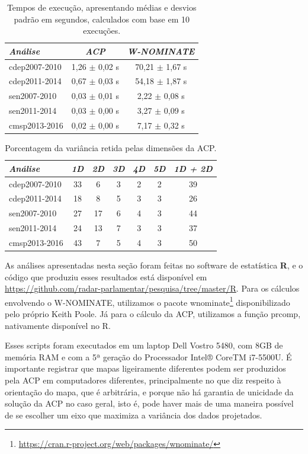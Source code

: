 \documentclass[
	article,			%
	12pt,				%
	oneside,			%
	a4paper,			%
	english,			%
	brazil,				%
	sumario=tradicional,
	oldfontcommands %
	]{abntex2}
\newcommand\wnominate{W-NOMINATE\xspace}
\begin{document}
\begin{table}
\centering
\begin{tabular}{l c c}
\itshape Análise & \itshape ACP & \itshape \wnominate \\
\hline
cdep2007-2010 & 1,26 $\pm$ 0,02 s & 70,21 $\pm$ 1,67 s \\ 
cdep2011-2014 & 0,67 $\pm$ 0,03 s & 54,18 $\pm$ 1,87 s \\ 
sen2007-2010  & 0,03 $\pm$ 0,01 s & 2,22 $\pm$ 0,08 s  \\ 
sen2011-2014  & 0,03 $\pm$ 0,00 s & 3,27 $\pm$ 0,09 s  \\ 
cmsp2013-2016 & 0,02 $\pm$ 0,00 s & 7,17 $\pm$ 0,32 s  \\ 
\end{tabular} 
\caption{Tempos de execução, apresentando médias e desvios padrão em segundos, calculados com base em 10 execuções.}
\label{tab:tempos}
\end{table}


\begin{table}
\centering
\begin{tabular}{l c c c c c | c}
\itshape Análise & \itshape 1D & \itshape 2D & \itshape 3D & \itshape 4D & \itshape 5D & \itshape 1D + 2D \\
\hline
cdep2007-2010 & 33 &  6 & 3 & 2 & 2 & 39  \\ 
cdep2011-2014 & 18 &  8 & 5 & 3 & 3 & 26  \\ 
sen2007-2010  & 27 & 17 & 6 & 4 & 3 & 44  \\ 
sen2011-2014  & 24 & 13 & 7 & 3 & 3 & 37  \\ 
cmsp2013-2016 & 43 &  7 & 5 & 4 & 3 & 50  \\ 
\end{tabular} 
\caption{Porcentagem da variância retida pelas dimensões da ACP.}
\label{tab:variacao-explicada-acp}
\end{table}

As análises apresentadas nesta seção foram feitas no software de estatística \textbf{R}, e o código que produziu esses resultados está disponível em \url{https://github.com/radar-parlamentar/pesquisa/tree/master/R}. Para os cálculos envolvendo o \wnominate, utilizamos o pacote \textsf{wnominate}\footnote{\url{https://cran.r-project.org/web/packages/wnominate/}} disponibilizado pelo próprio Keith Poole. Já para o cálculo da ACP, utilizamos a função \textsf{prcomp}, nativamente disponível no R.

Esses scripts foram executados em um laptop Dell Vostro 5480, com 8GB de memória RAM e com a 5ª geração do Processador Intel® CoreTM i7-5500U. É importante registrar que mapas ligeiramente diferentes podem ser produzidos pela ACP em computadores diferentes, principalmente no que diz respeito à orientação do mapa, que é arbitrária, e porque não há garantia de unicidade da solução da ACP no caso geral, isto é, pode haver mais de uma maneira possível de se escolher um eixo que maximiza a variância dos dados projetados.
\end{document}

